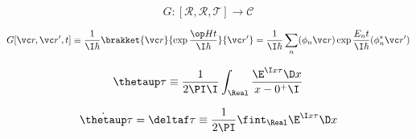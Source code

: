 \documentclass[fleqn, 12pt]{article}
\begin{document}
\[ G : [\mathcal R, \mathcal R, \mathcal T] \to \mathcal C \]

\[ G[\vc r, \vc r', t]
\equiv
\frac{1}{\I \hbar}
\brakket{\vc r}{\exp \frac{\op H t}{\I \hbar}}{\vc r'}
=
\frac{1}{\I \hbar}
\sum_{n} (\phi_n \vc r) \exp \frac{E_n t}{\I \hbar} (\phi_n^* \vc r')
\]

\[ \thetaup \tau \equiv \frac{1}{2 \PI \I}
\int_{\Real} \frac{\E^{\I x \tau} \D x}{x - 0^+ \I} \]

\[ \dot \thetaup \tau = \deltaf \tau \equiv \frac{1}{2 \PI}
\fint_{\Real} \E^{\I x \tau} \D x \]
\end{document}
